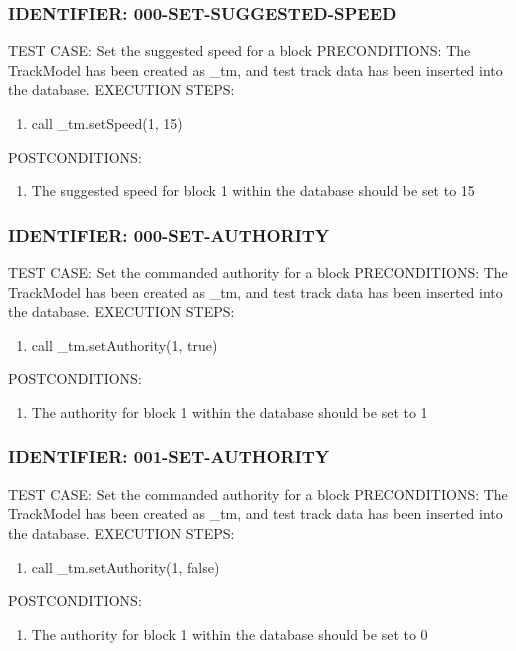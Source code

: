 \documentclass{scrreprt}
\begin{document}
\subsubsection{IDENTIFIER: 000-SET-SUGGESTED-SPEED}
TEST CASE: Set the suggested speed for a block
PRECONDITIONS: The TrackModel has been created as _tm, and test track data has been inserted into the database.
EXECUTION STEPS:
\begin{enumerate}
	\item call _tm.setSpeed(1, 15)
\end{enumerate}
POSTCONDITIONS:
\begin{enumerate}
	\item The suggested speed for block 1 within the database should be set to 15
\end{enumerate}

\subsubsection{IDENTIFIER: 000-SET-AUTHORITY}
TEST CASE: Set the commanded authority for a block
PRECONDITIONS: The TrackModel has been created as _tm, and test track data has been inserted into the database.
EXECUTION STEPS:
\begin{enumerate}
	\item call _tm.setAuthority(1, true)
\end{enumerate}
POSTCONDITIONS:
\begin{enumerate}
	\item The authority for block 1 within the database should be set to 1
\end{enumerate}

\subsubsection{IDENTIFIER: 001-SET-AUTHORITY}
TEST CASE: Set the commanded authority for a block
PRECONDITIONS: The TrackModel has been created as _tm, and test track data has been inserted into the database.
EXECUTION STEPS:
\begin{enumerate}
	\item call _tm.setAuthority(1, false)
\end{enumerate}
POSTCONDITIONS:
\begin{enumerate}
	\item The authority for block 1 within the database should be set to 0
\end{enumerate}
\end{document}
